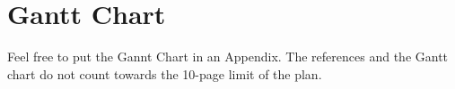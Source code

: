 \documentclass[12pt, english, NoHyper]{AE4010-template}
\begin{document}
\appendix




\section{Gantt Chart}
Feel free to put the Gannt Chart in an Appendix. The references and the Gantt chart do not count towards the 10-page limit of the plan.
\end{document}
